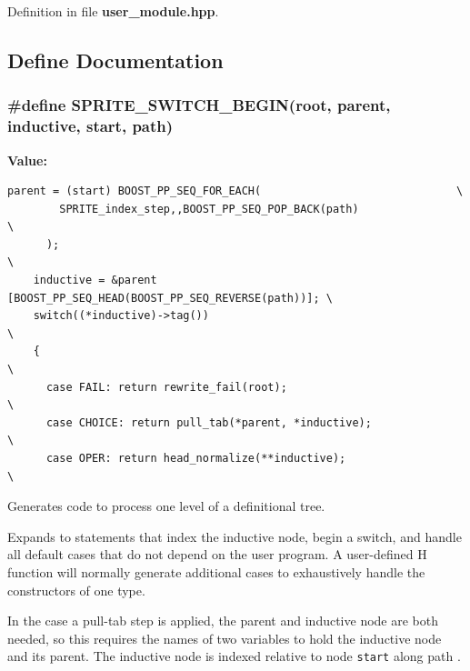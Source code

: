 Definition in file {\bf user\_\-module.hpp}.

\subsection{Define Documentation}
\subsubsection{\setlength{\rightskip}{0pt plus 5cm}\#define SPRITE\_\-SWITCH\_\-BEGIN(root, parent, inductive, start, path)}\label{user__module_8hpp_a1}


{\bf Value:}

\footnotesize\begin{verbatim}parent = (start) BOOST_PP_SEQ_FOR_EACH(                              \
        SPRITE_index_step,,BOOST_PP_SEQ_POP_BACK(path)                   \
      );                                                                 \
    inductive = &parent [BOOST_PP_SEQ_HEAD(BOOST_PP_SEQ_REVERSE(path))]; \
    switch((*inductive)->tag())                                          \
    {                                                                    \
      case FAIL: return rewrite_fail(root);                              \
      case CHOICE: return pull_tab(*parent, *inductive);                 \
      case OPER: return head_normalize(**inductive);                     \
\end{verbatim}\normalsize 
Generates code to process one level of a definitional tree. 

Expands to statements that index the inductive node, begin a switch, and handle all default cases that do not depend on the user program. A user-defined H function will normally generate additional cases to exhaustively handle the constructors of one type.

In the case a pull-tab step is applied, the parent and inductive node are both needed, so this requires the names of two variables to hold the inductive node and its parent. The inductive node is indexed relative to node {\tt start} along path .

